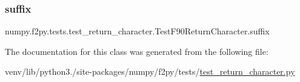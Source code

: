 \subsubsection{\texorpdfstring{suffix}{suffix}}
{\footnotesize\ttfamily numpy.\+f2py.\+tests.\+test\+\_\+return\+\_\+character.\+Test\+F90\+Return\+Character.\+suffix\hspace{0.3cm}{\ttfamily [static]}}



The documentation for this class was generated from the following file\+:\begin{DoxyCompactItemize}
\item 
venv/lib/python3./site-\/packages/numpy/f2py/tests/\hyperlink{test__return__character_8py}{test\+\_\+return\+\_\+character.\+py}\end{DoxyCompactItemize}
